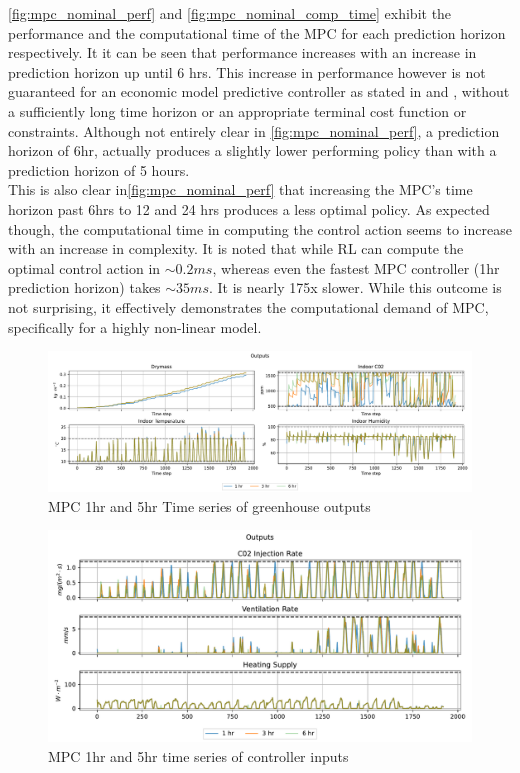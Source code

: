 \autoref{fig:mpc_nominal_perf} and \autoref{fig:mpc_nominal_comp_time} exhibit the performance and the computational time of the MPC for each prediction horizon respectively. It it can be seen that performance increases with an increase in prediction horizon up until 6 hrs. This increase in performance however is not guaranteed for an economic model predictive controller as stated in \cite{ellisTutorialReviewEconomic2014}  and \cite{amritEconomicOptimizationUsing2011}, without a sufficiently long time horizon or an appropriate terminal cost function or constraints. Although not entirely clear in \autoref{fig:mpc_nominal_perf}, a prediction horizon of 6hr, actually produces a slightly lower performing policy than with a prediction horizon of 5 hours. \\
This is also clear in\autoref{fig:mpc_nominal_perf} that increasing the MPC's time horizon past 6hrs to 12 and 24 hrs produces a less optimal policy. As expected though, the computational time in computing the control action seems to increase with an increase in complexity. It is noted that while RL can compute the optimal control action in $ \sim 0.2 ms$, whereas even the fastest MPC controller (1hr prediction horizon) takes $\sim 35 ms$. It is nearly 175x slower.  While this outcome is not surprising, it effectively demonstrates the computational demand of MPC, specifically for a highly non-linear model.

\begin{figure}[H]
	\centering
	\includegraphics[width=\textwidth]{figures/mpc_outputs_time_series.pdf}
	\caption{MPC 1hr and 5hr Time series of greenhouse outputs}
	\label{fig:mpc-timeseries-outputs}
\end{figure}

\begin{figure}[H]
	\centering
	\includegraphics[width=\textwidth]{figures/mpc_inputs_times_series.pdf}
	\caption{MPC 1hr and 5hr time series of controller inputs}
	\label{fig:mpc-timeseries-inputs}
\end{figure}

